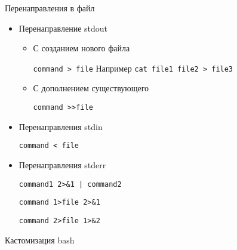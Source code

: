 \documentclass[ignorenonframetext, professionalfonts, hyperref={pdftex, unicode}]{beamer}
\begin{document}
\begin{frame}{Перенаправления в файл}
\begin{itemize}
\item Перенаправление stdout 
\begin{itemize}
\item С созданием нового файла

{\tt command > file} Например {\tt cat file1 file2 > file3}
\item С дополнением существующего

{\tt command >>file}
\end{itemize}
\pause
\item Перенаправления stdin

{\tt command < file}
\pause
\item Перенаправления stderr
 
{\tt command1 2>\&1 | command2}

{\tt command 1>file 2>\&1}

{\tt command 2>file 1>\&2}
\end{itemize}
\end{frame}
\begin{frame}{Кастомизация bash}
\end{frame}
\end{document}
